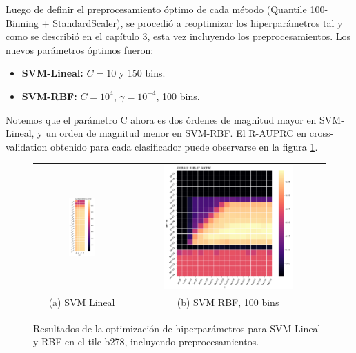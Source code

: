 Luego de definir el preprocesamiento óptimo de cada método (Quantile 100-Binning + StandardScaler), se procedió a reoptimizar los hiperparámetros tal y como se describió en el capítulo 3, esta vez incluyendo los preprocesamientos. Los nuevos parámetros óptimos fueron: 

\begin{itemize}
\item \textbf{SVM-Lineal:} $C=10$ y 150 bins.
\item \textbf{SVM-RBF:} $C=10^4$, $\gamma = 10^{-4}$, 100 bins.
\end{itemize}  

Notemos que el parámetro C ahora es dos órdenes de magnitud mayor en SVM-Lineal, y un orden de magnitud menor en SVM-RBF. El R-AUPRC en cross-validation obtenido para cada clasificador puede observarse en la figura \ref{fig:reopt_param}. \\

\begin{figure}[h!]
\begin{tabular}{cc}
  \includegraphics[width=0.29\textwidth]{Kap4/reoptl.png} &   \includegraphics[width=0.7\textwidth]{Kap4/reoptk.png} \\
(a) SVM Lineal & (b) SVM RBF, 100 bins
\end{tabular}
\caption{Resultados de la optimización de hiperparámetros para SVM-Lineal y RBF en el tile b278, incluyendo preprocesamientos.}
\label{fig:reopt_param}
\end{figure}


